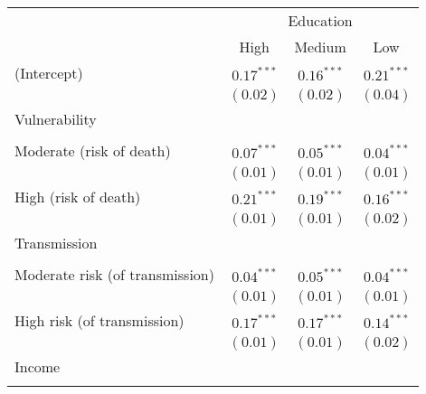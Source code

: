 
\begin{table}
\begin{center}
\begin{scriptsize}
\begin{tabular}{l c c c}
\hline
 & \multicolumn{3}{c}{Education} \\
\cline{2-4}
 & High & Medium & Low \\
\hline
(Intercept)                                     & $0.17^{***}$  & $0.16^{***}$  & $0.21^{***}$ \\
                                                & $(0.02)$      & $(0.02)$      & $(0.04)$     \\
Vulnerability                                   &               &               &              \\
                                                &               &               &              \\
\quad Moderate (risk of death)                  & $0.07^{***}$  & $0.05^{***}$  & $0.04^{***}$ \\
                                                & $(0.01)$      & $(0.01)$      & $(0.01)$     \\
\quad High (risk of death)                      & $0.21^{***}$  & $0.19^{***}$  & $0.16^{***}$ \\
                                                & $(0.01)$      & $(0.01)$      & $(0.02)$     \\
Transmission                                    &               &               &              \\
                                                &               &               &              \\
\quad Moderate risk (of transmission)           & $0.04^{***}$  & $0.05^{***}$  & $0.04^{***}$ \\
                                                & $(0.01)$      & $(0.01)$      & $(0.01)$     \\
\quad High risk (of transmission)               & $0.17^{***}$  & $0.17^{***}$  & $0.14^{***}$ \\
                                                & $(0.01)$      & $(0.01)$      & $(0.02)$     \\
Income                                          &               &               &              \\
                                                &               &               &              \\

\end{tabular}
\end{scriptsize}
\end{center}
\end{table}
